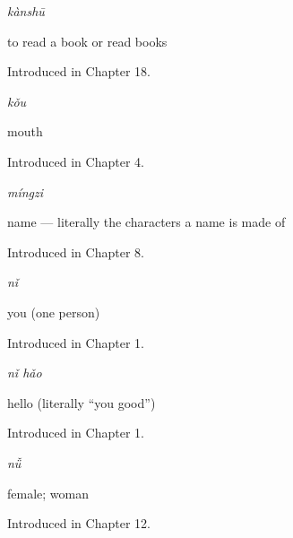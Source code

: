 \noindent\begin{minipage}[t]{\linewidth}
\raggedright
\textbf{}\enspace\emph{kànshū}\par
\small to read a book or read books\par
\footnotesize Introduced in Chapter 18.
\end{minipage}\par\medskip

\noindent\begin{minipage}[t]{\linewidth}
\raggedright
\textbf{}\enspace\emph{kǒu}\par
\small mouth\par
\footnotesize Introduced in Chapter 4.
\end{minipage}\par\medskip

\noindent\begin{minipage}[t]{\linewidth}
\raggedright
\textbf{}\enspace\emph{míngzi}\par
\small name — literally the characters a name is made of\par
\footnotesize Introduced in Chapter 8.
\end{minipage}\par\medskip

\noindent\begin{minipage}[t]{\linewidth}
\raggedright
\textbf{}\enspace\emph{nǐ}\par
\small you (one person)\par
\footnotesize Introduced in Chapter 1.
\end{minipage}\par\medskip

\noindent\begin{minipage}[t]{\linewidth}
\raggedright
\textbf{}\enspace\emph{nǐ hǎo}\par
\small hello (literally \textquotedblleft{}you good\textquotedblright{})\par
\footnotesize Introduced in Chapter 1.
\end{minipage}\par\medskip

\noindent\begin{minipage}[t]{\linewidth}
\raggedright
\textbf{}\enspace\emph{nǚ}\par
\small female; woman\par
\footnotesize Introduced in Chapter 12.
\end{minipage}\par\medskip

